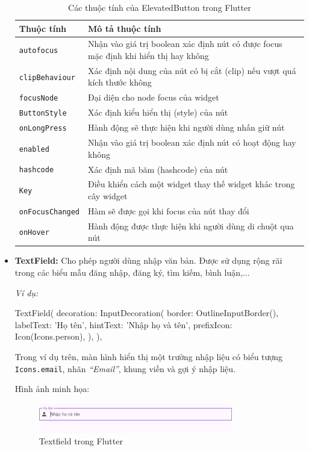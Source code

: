 \documentclass[../DoAn.tex]{subfiles}
\numberwithin{figure}{chapter}
\begin{document}
\begin{itemize}
\begin{table}[H]
\centering
\begin{tabular}{|>{\centering\arraybackslash}p{4cm}|>{\centering\arraybackslash}p{9cm}|}
\hline
\textbf{Thuộc tính} & \textbf{Mô tả thuộc tính} \\ \hline
\texttt{autofocus} & Nhận vào giá trị boolean xác định nút có được focus mặc định khi hiển thị hay không \\ \hline
\texttt{clipBehaviour} & Xác định nội dung của nút có bị cắt (clip) nếu vượt quá kích thước không \\ \hline
\texttt{focusNode} & Đại diện cho node focus của widget \\ \hline
\texttt{ButtonStyle} & Xác định kiểu hiển thị (style) của nút \\ \hline
\texttt{onLongPress} & Hành động sẽ thực hiện khi người dùng nhấn giữ nút \\ \hline
\texttt{enabled} & Nhận vào giá trị boolean xác định nút có hoạt động hay không \\ \hline
\texttt{hashcode} & Xác định mã băm (hashcode) của nút \\ \hline
\texttt{Key} & Điều khiển cách một widget thay thế widget khác trong cây widget \\ \hline
\texttt{onFocusChanged} & Hàm sẽ được gọi khi focus của nút thay đổi \\ \hline
\texttt{onHover} & Hành động được thực hiện khi người dùng di chuột qua nút \\ \hline
\end{tabular}
\caption{Các thuộc tính của ElevatedButton trong Flutter}
\label{tab:elevated_button_properties}
\end{table}

\item \textbf{TextField:} Cho phép người dùng nhập văn bản. Được sử dụng rộng rãi trong các biểu mẫu đăng nhập, đăng ký, tìm kiếm, bình luận,...

\textit{Ví dụ:}
\begin{myverbatim}
TextField(
  decoration: InputDecoration(
    border: OutlineInputBorder(),
    labelText: 'Họ tên',
    hintText: 'Nhập họ và tên',
    prefixIcon: Icon(Icons.person),
  ),
),
\end{myverbatim}

Trong ví dụ trên, màn hình hiển thị một trường nhập liệu có biểu tượng \texttt{Icons.email}, nhãn \textit{“Email”}, khung viền và gợi ý nhập liệu.

Hình ảnh minh họa:
\begin{figure}[H]
    \centering
    \includegraphics[width=0.8\textwidth]{Hinhve/Chuong5/textfieldWidget.png}
    \caption{Textfield trong Flutter}
    \label{fig:textfieldwidget}
\end{figure}


\end{itemize}
\end{document}
